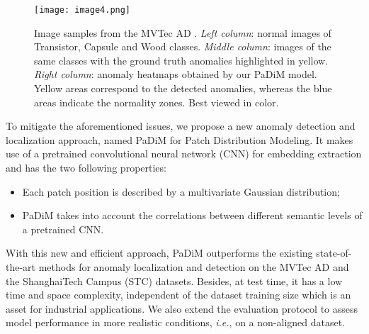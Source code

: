 \documentclass[a4paper,conference]{IEEEtran}
\begin{document}
\begin{figure}[!t]

\texttt{[image: image4.png]}
\caption{Image samples from the MVTec AD \cite{bergmann2019mvtec}. \textit{Left column}: normal images of Transistor, Capsule and Wood classes. \textit{Middle column}: images of the same classes with the ground truth anomalies highlighted in yellow. \textit{Right column}: anomaly heatmaps obtained by our PaDiM model. Yellow areas correspond to the detected anomalies, whereas the blue areas indicate the normality zones. Best viewed in color.}






\label{fig:segim}
\end{figure}

To mitigate the aforementioned issues, we propose a new anomaly detection and localization approach, named
PaDiM for Patch Distribution Modeling. It makes use of a pretrained convolutional neural network (CNN) for embedding extraction and has the two following properties:  

\begin{itemize}

  \item Each patch position is described by a multivariate Gaussian distribution;
  \item PaDiM takes into account the correlations between different semantic levels of a pretrained CNN.

\end{itemize}



With this new and efficient approach, PaDiM outperforms the existing state-of-the-art methods for anomaly localization and detection on the MVTec AD \cite{bergmann2019mvtec} and the ShanghaiTech Campus (STC) \cite{liu2018ano_pred} datasets. Besides, at test time, it has a low time and space complexity, independent of the dataset training size which is an asset for industrial applications. We also extend the evaluation protocol to assess model performance in more realistic conditions, \textit{i.e.}, on a non-aligned dataset. 
\end{document}
